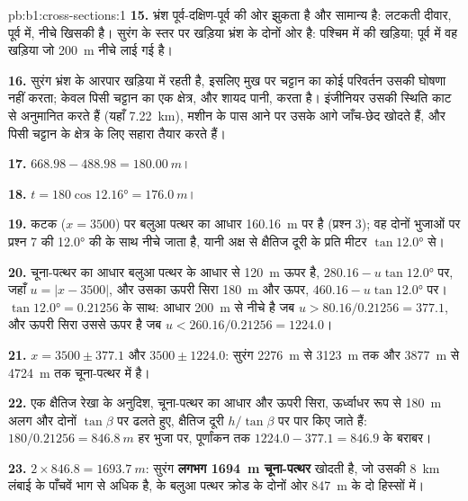 \begin{solution}{pb:b1:cross-sections:1}
\textbf{15.} भ्रंश पूर्व-दक्षिण-पूर्व की ओर झुकता है और सामान्य है: लटकती दीवार, पूर्व में, नीचे खिसकी है। सुरंग के स्तर पर
खड़िया भ्रंश के दोनों ओर है: पश्चिम में  की खड़िया; पूर्व में वह खड़िया जो \qty{200}{m} नीचे लाई गई है।

\textbf{16.} सुरंग भ्रंश के आरपार खड़िया में रहती है, इसलिए मुख पर चट्टान का कोई परिवर्तन उसकी घोषणा नहीं करता; केवल
पिसी चट्टान का एक क्षेत्र, और शायद पानी, करता है। इंजीनियर उसकी स्थिति काट से अनुमानित करते हैं (यहाँ
\qty{7.22}{km}), मशीन के पास आने पर उसके आगे जाँच-छेद खोदते हैं, और पिसी चट्टान के क्षेत्र के लिए सहारा तैयार करते हैं।

\textbf{17.} $668.98 - 488.98 = \qty{180.00}{m}$।

\textbf{18.} $t = 180\cos\ang{12.16} = \qty{176.0}{m}$।

\textbf{19.} कटक ($x = 3500$) पर बलुआ पत्थर का आधार \qty{160.16}{m} पर है (प्रश्न 3); वह दोनों भुजाओं पर प्रश्न 7 की
\ang{12.0} की  के साथ नीचे जाता है, यानी अक्ष से क्षैतिज दूरी के प्रति मीटर $\tan\ang{12.0}$ से।

\textbf{20.} चूना-पत्थर का आधार बलुआ पत्थर के आधार से \qty{120}{m} ऊपर है, $280.16 - u\tan\ang{12.0}$ पर, जहाँ $u = |x - 3500|$,
और उसका ऊपरी सिरा \qty{180}{m} और ऊपर, $460.16 - u\tan\ang{12.0}$ पर। $\tan\ang{12.0} =
0.21256$ के साथ: आधार \qty{200}{m} से नीचे है जब $u > 80.16/0.21256 = 377.1$, और ऊपरी सिरा उससे ऊपर है जब
$u < 260.16/0.21256 = 1224.0$।

\textbf{21.} $x = 3500 \pm 377.1$ और $3500 \pm 1224.0$: सुरंग \qty{2276}{m} से \qty{3123}{m} तक और \qty{3877}{m} से
\qty{4724}{m} तक चूना-पत्थर में है।

\textbf{22.} एक क्षैतिज रेखा के अनुदिश, चूना-पत्थर का आधार और ऊपरी सिरा, ऊर्ध्वाधर रूप से \qty{180}{m} अलग और दोनों
$\tan\beta$ पर ढलते हुए, क्षैतिज दूरी $h/\tan\beta$ पर पार किए जाते हैं: $180/0.21256 = \qty{846.8}{m}$ हर भुजा पर,
पूर्णांकन तक $1224.0 - 377.1 = 846.9$ के बराबर।

\textbf{23.} $2\times846.8 = \qty{1693.7}{m}$: सुरंग \textbf{लगभग \qty[text-series-to-math=true]{1694}{m} चूना-पत्थर} खोदती है,
जो उसकी \qty{8}{km} लंबाई के पाँचवें भाग से अधिक है,  के बलुआ पत्थर क्रोड के दोनों ओर \qty{847}{m} के
दो हिस्सों में।
\end{solution}
